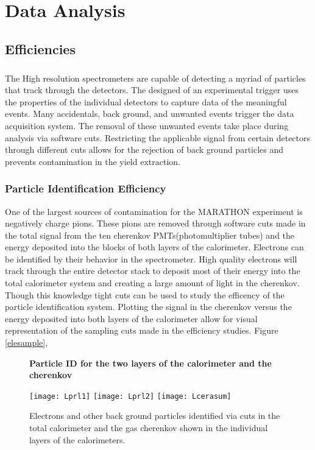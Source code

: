 \chapter{Data Analysis}

\section{Efficiencies}
\paragraph{}The High resolution spectrometers are capable of detecting a myriad of particles that track through the detectors. The designed of an experimental trigger uses the properties of the individual detectors to capture data of the meaningful events. Many accidentals, back ground, and unwanted events trigger the data acquisition system. The removal of these unwanted events take place during analysis via software cuts. Restricting the applicable signal from certain detectors through different cuts allows for the rejection of back ground particles and prevents contamination in the yield extraction. 

\subsection{Particle Identification Efficiency}
One of the largest sources of contamination for the MARATHON experiment is negatively charge pions. These pions are removed through software cuts made in the total signal from the ten cherenkov PMTs(photomultiplier tubes) and the energy deposited into the blocks of both layers of the calorimeter. Electrons can be identified by their behavior in the spectrometer. High quality electrons will track through the entire detector stack to deposit most of their energy into the total calorimeter system and creating a large amount of light in the cherenkov. Though this knowledge tight cuts can be used to study the efficency of the particle identification system. Plotting the signal in the cherenkov versus the energy deposited into both layers of the calorimeter allow for visual representation of the sampling cuts made in the efficiency studies. Figure \ref{elesample}, 



\begin{figure}[h]
{\centering
\textbf{Particle ID for the two layers of the calorimeter and the cherenkov}\par\medskip}

\label{Prl1Plr2}
\texttt{[image: Lprl1]}
\texttt{[image: Lprl2]}
\texttt{[image: Lcerasum]}
\caption{Electrons and other back ground particles identified via cuts in the total calorimeter and the gas cherenkov shown in the individual layers of the calorimeters.}
\end{figure}

